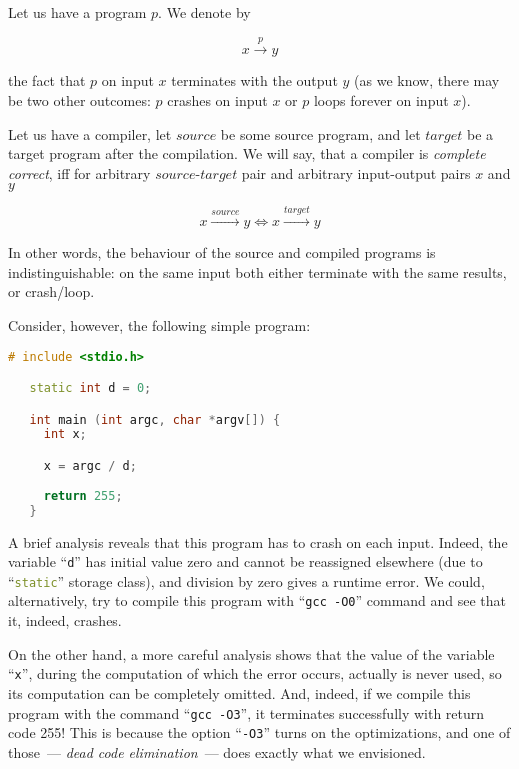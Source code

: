 Let us have a program $p$. We denote by

\[
x\xrightarrow{\displaystyle{p}} y
\]

the fact that $p$ on input $x$ terminates with the output $y$ (as we know, there may be two other outcomes: $p$ crashes on input $x$ or
$p$ loops forever on input $x$). 

Let us have a compiler, let $source$ be some source program, and let $target$ be a target program after the compilation.
We will say, that a compiler is \emph{complete correct}, iff for arbitrary $source$-$target$ pair and arbitrary
input-output pairs $x$ and $y$

\[
x\xrightarrow{\displaystyle{source}}y \Longleftrightarrow x\xrightarrow{\displaystyle{target}}y
\]

In other words, the behaviour of the source and compiled programs is indistinguishable: on the same input both either
terminate with the same results, or crash/loop.

Consider, however, the following simple program:

\begin{lstlisting}[language=cc]
   # include <stdio.h>

   static int d = 0;

   int main (int argc, char *argv[]) {
     int x;

     x = argc / d;
    
     return 255;
   }  
\end{lstlisting}

A brief analysis reveals that this program has to crash on each input. Indeed, the variable ``\lstinline[language=cc,basicstyle=\normalsize]|d|'' has initial value zero and cannot
be reassigned elsewhere (due to ``\lstinline[language=cc,basicstyle=\normalsize]|static|'' storage class), and division by zero gives a runtime error. We could, alternatively,
try to compile this program with ``\texttt{gcc -O0}'' command and see that it, indeed, crashes.

On the other hand, a more careful analysis shows that the value of the variable ``\lstinline[language=cc,basicstyle=\normalsize]|x|'', during the computation
of which the error occurs, actually is never used, so its computation can be completely omitted. And, indeed, if we compile this program with the command ``\texttt{gcc -O3}'',
it terminates successfully with return code 255! This is because the option ``\texttt{-O3}'' turns on the optimizations, and one of those~--- \emph{dead code elimination}~---
does exactly what we envisioned.

